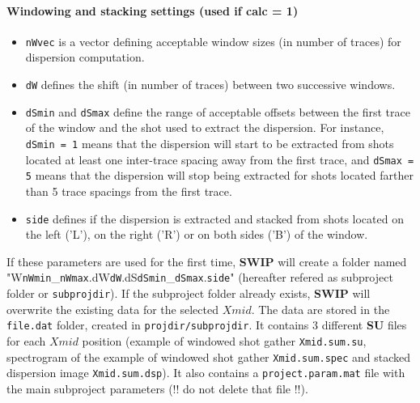 \documentclass[twoside,a4paper]{article}
\def\SWIP{\textbf{SWIP}}
\def\SU{\textbf{SU}}
\begin{document}
\paragraph{Windowing and stacking settings (used if calc = 1)}
\begin{itemize}[leftmargin=*]
\setlength\itemsep{2ex}
\item \verb|nWvec| is a vector defining acceptable window sizes (in number of traces) for dispersion computation.

\item \verb|dW| defines the shift (in number of traces) between two successive windows.

\item \verb|dSmin| and \verb|dSmax| define the range of acceptable offsets between the first trace of the window and the shot used to extract the dispersion. For instance, \verb|dSmin = 1| means that the dispersion will start to be extracted from shots located at least one inter-trace spacing away from the first trace, and \verb|dSmax = 5| means that the dispersion will stop being extracted for shots located farther than 5 trace spacings from the first trace.

\item \verb|side| defines if the dispersion is extracted and stacked from shots located on the left ('L'), on the right ('R') or on both sides ('B') of the window.
\end{itemize}

If these parameters are used for the first time, {\SWIP} will create a folder named "W\verb|nWmin|\_\verb|nWmax|.dW\verb|dW|.dS\verb|dSmin|\_\verb|dSmax|.\verb|side|" (hereafter refered as subproject folder or \verb|subprojdir|). If the subproject folder already exists, {\SWIP} will overwrite the existing data for the selected $Xmid$. The data  are stored in the \verb|file.dat| folder, created in \verb|projdir/subprojdir|. It contains 3 different {\SU} files for each $Xmid$ position (example of windowed shot gather \verb|Xmid.sum.su|, spectrogram of the example of windowed shot gather \verb|Xmid.sum.spec| and stacked dispersion image \verb|Xmid.sum.dsp|). It also contains a \verb|project.param.mat| file with the main subproject parameters (!! do not delete that file !!).
\end{document}
